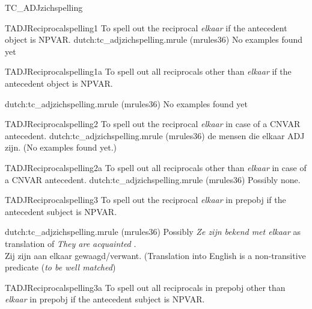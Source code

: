 \begin{mruleclass}{TC\_ADJzichspelling}
\begin{members}
\begin{member}
\end{member}
\begin{member}
 TADJReciprocalspelling1
 To spell out the reciprocal {\em elkaar} 
if the antecedent object 
 is NPVAR.
\file dutch:tc\_adjzichspelling.mrule (mrules36)
\semantics \nosemantics
\example No examples found yet
\remarks\mbox{}

\end{member}
\begin{member}
 TADJReciprocalspelling1a
 To spell out all reciprocals other than {\em elkaar} if the antecedent object 
 is NPVAR.

\file dutch:tc\_adjzichspelling.mrule (mrules36)
\semantics \nosemantics
\example No examples found yet
\remarks\mbox{}

\end{member}
\begin{member}
 TADJReciprocalspelling2
 To spell out the reciprocal {\em elkaar} in case of a 
CNVAR antecedent.
\file dutch:tc\_adjzichspelling.mrule (mrules36)
\semantics \nosemantics
\example de mensen die elkaar ADJ zijn. (No examples found yet.)
\remarks\mbox{}

\end{member}
\begin{member}
 TADJReciprocalspelling2a
 To spell out all reciprocals other than {\em elkaar} in case of a 
CNVAR antecedent.
\file dutch:tc\_adjzichspelling.mrule (mrules36)
\semantics \nosemantics
\example Possibly none. 
\remarks\mbox{}

\end{member}
\begin{member}
 TADJReciprocalspelling3
 To spell out the reciprocal {\em elkaar} 
in prepobj if the antecedent 
subject is NPVAR.

\file dutch:tc\_adjzichspelling.mrule (mrules36)
\semantics \nosemantics
\example Possibly {\em Ze zijn bekend met elkaar} as 
translation of  {\em They are acquainted }.\\
Zij zijn aan elkaar gewaagd/verwant. (Translation into 
English is a non-transitive predicate ({\em to be well matched})
\remarks\mbox{}

\end{member}
\begin{member}
 TADJReciprocalspelling3a
 To spell out all reciprocals in prepobj other than {\em elkaar} 
in prepobj if the antecedent 
subject is NPVAR.


\end{member}
\end{members}
\end{mruleclass}

